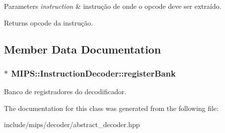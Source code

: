 \begin{DoxyParams}{Parameters}
{\em instruction} & instrução de onde o opcode deve ser extraído. \\
\hline
\end{DoxyParams}
\begin{DoxyReturn}{Returns}
opcode da instrução. 
\end{DoxyReturn}


\subsection{Member Data Documentation}
\subsubsection[{\texorpdfstring{register\+Bank}{registerBank}}]{$\ast$ M\+I\+P\+S\+::\+Instruction\+Decoder\+::register\+Bank\hspace{0.3cm}{\ttfamily [protected]}}\hypertarget{classMIPS_1_1InstructionDecoder_ad47ec78a48f63bc4ae3863bd0b7de86e}{}\label{classMIPS_1_1InstructionDecoder_ad47ec78a48f63bc4ae3863bd0b7de86e}
Banco de registradores do decodificador. 

The documentation for this class was generated from the following file\+:\begin{DoxyCompactItemize}
\item 
include/mips/decoder/abstract\+\_\+decoder.\+hpp\end{DoxyCompactItemize}
